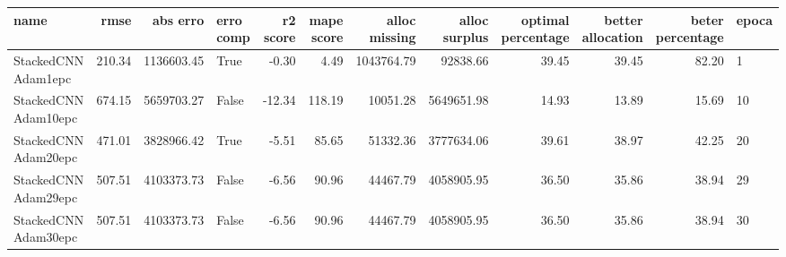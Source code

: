 \begin{tabular}{lrrlrrrrrrrl}
\toprule
name & rmse & abs erro & erro comp & r2 score & mape score & alloc missing & alloc surplus & optimal percentage & better allocation & beter percentage & epoca \\
\midrule
StackedCNN Adam1epc & 210.34 & 1136603.45 & True & -0.30 & 4.49 & 1043764.79 & 92838.66 & 39.45 & 39.45 & 82.20 & 1 \\
StackedCNN Adam10epc & 674.15 & 5659703.27 & False & -12.34 & 118.19 & 10051.28 & 5649651.98 & 14.93 & 13.89 & 15.69 & 10 \\
StackedCNN Adam20epc & 471.01 & 3828966.42 & True & -5.51 & 85.65 & 51332.36 & 3777634.06 & 39.61 & 38.97 & 42.25 & 20 \\
StackedCNN Adam29epc & 507.51 & 4103373.73 & False & -6.56 & 90.96 & 44467.79 & 4058905.95 & 36.50 & 35.86 & 38.94 & 29 \\
StackedCNN Adam30epc & 507.51 & 4103373.73 & False & -6.56 & 90.96 & 44467.79 & 4058905.95 & 36.50 & 35.86 & 38.94 & 30 \\
\bottomrule
\end{tabular}
